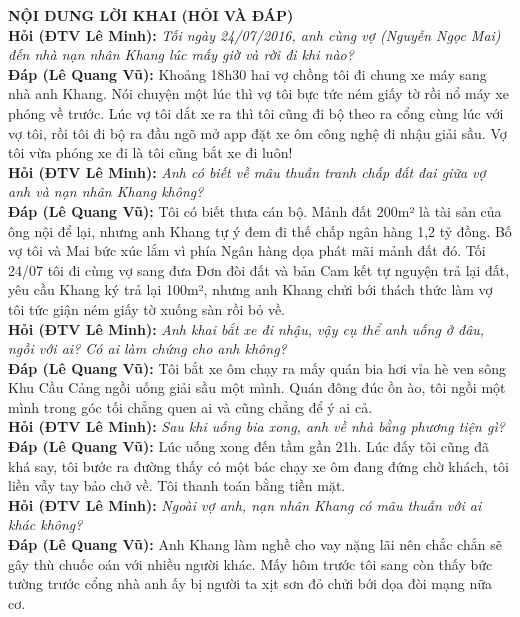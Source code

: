 \documentclass[12pt,a4paper]{article}
\begin{document}
\vspace{0.3cm}\noindent\textbf{\large NỘI DUNG LỜI KHAI (HỎI VÀ ĐÁP)}\\[0.15cm]


\noindent\textbf{Hỏi (ĐTV Lê Minh):} \textit{Tối ngày 24/07/2016, anh cùng vợ (Nguyễn Ngọc Mai) đến nhà nạn nhân Khang lúc mấy giờ và rời đi khi nào?}\\[0.15cm]
\noindent\textbf{Đáp (Lê Quang Vũ):} Khoảng 18h30 hai vợ chồng tôi đi chung xe máy sang nhà anh Khang. Nói chuyện một lúc thì vợ tôi bực tức ném giấy tờ rồi nổ máy xe phóng về trước. Lúc vợ tôi dắt xe ra thì tôi cũng đi bộ theo ra cổng cùng lúc với vợ tôi, rồi tôi đi bộ ra đầu ngõ mở app đặt xe ôm công nghệ đi nhậu giải sầu. Vợ tôi vừa phóng xe đi là tôi cũng bắt xe đi luôn!\\[0.35cm]

\noindent\textbf{Hỏi (ĐTV Lê Minh):} \textit{Anh có biết về mâu thuẫn tranh chấp đất đai giữa vợ anh và nạn nhân Khang không?}\\[0.15cm]
\noindent\textbf{Đáp (Lê Quang Vũ):} Tôi có biết thưa cán bộ. Mảnh đất 200m² là tài sản của ông nội để lại, nhưng anh Khang tự ý đem đi thế chấp ngân hàng 1,2 tỷ đồng. Bố vợ tôi và Mai bức xúc lắm vì phía Ngân hàng dọa phát mãi mảnh đất đó. Tối 24/07 tôi đi cùng vợ sang đưa Đơn đòi đất và bản Cam kết tự nguyện trả lại đất, yêu cầu Khang ký trả lại 100m², nhưng anh Khang chửi bới thách thức làm vợ tôi tức giận ném giấy tờ xuống sàn rồi bỏ về.\\[0.35cm]

\noindent\textbf{Hỏi (ĐTV Lê Minh):} \textit{Anh khai bắt xe đi nhậu, vậy cụ thể anh uống ở đâu, ngồi với ai? Có ai làm chứng cho anh không?}\\[0.15cm]
\noindent\textbf{Đáp (Lê Quang Vũ):} Tôi bắt xe ôm chạy ra mấy quán bia hơi vỉa hè ven sông Khu Cầu Cảng ngồi uống giải sầu một mình. Quán đông đúc ồn ào, tôi ngồi một mình trong góc tối chẳng quen ai và cũng chẳng để ý ai cả.\\[0.35cm]

\noindent\textbf{Hỏi (ĐTV Lê Minh):} \textit{Sau khi uống bia xong, anh về nhà bằng phương tiện gì?}\\[0.15cm]
\noindent\textbf{Đáp (Lê Quang Vũ):} Lúc uống xong đến tầm gần 21h. Lúc đấy tôi cũng đã khá say, tôi bước ra đường thấy có một bác chạy xe ôm đang đứng chờ khách, tôi liền vẫy tay bảo chở về. Tôi thanh toán bằng tiền mặt.\\[0.35cm]

\noindent\textbf{Hỏi (ĐTV Lê Minh):} \textit{Ngoài vợ anh, nạn nhân Khang có mâu thuẫn với ai khác không?}\\[0.15cm]
\noindent\textbf{Đáp (Lê Quang Vũ):} Anh Khang làm nghề cho vay nặng lãi nên chắc chắn sẽ gây thù chuốc oán với nhiều người khác. Mấy hôm trước tôi sang còn thấy bức tường trước cổng nhà anh ấy bị người ta xịt sơn đỏ chửi bới dọa đòi mạng nữa cơ.\\[0.35cm]
\end{document}
